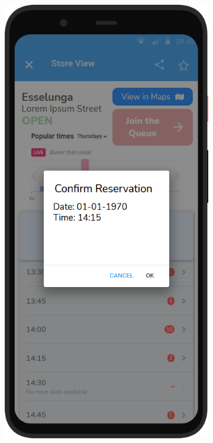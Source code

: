 \begin{figure}[H]
\begin{subfigure}{.33\textwidth}
        \label{fig:screen5}
    \end{subfigure}%
    \begin{subfigure}{.33\textwidth}
        \centering
        \includegraphics[width=.95\linewidth]{Images/screen_06.png}

\end{subfigure}
\end{figure}
